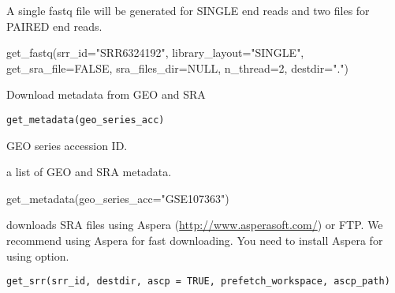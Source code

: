 \documentclass[letterpaper]{book}
\begin{document}
%
\begin{Value}
A single fastq file will be generated for SINGLE end reads and two files for PAIRED end reads.
\end{Value}
%
\begin{Examples}
\begin{ExampleCode}
get_fastq(srr_id="SRR6324192", library_layout="SINGLE", get_sra_file=FALSE, 
sra_files_dir=NULL, n_thread=2, destdir=".")

\end{ExampleCode}
\end{Examples}
%
\begin{Description}\relax
Download metadata from GEO and SRA
\end{Description}
%
\begin{Usage}
\begin{verbatim}
get_metadata(geo_series_acc)
\end{verbatim}
\end{Usage}
%
\begin{Arguments}
\begin{ldescription}
\item[\code{geo\_series\_acc}] GEO series accession ID.
\end{ldescription}
\end{Arguments}
%
\begin{Value}
a list of GEO and SRA metadata.
\end{Value}
%
\begin{Examples}
\begin{ExampleCode}

get_metadata(geo_series_acc="GSE107363")

\end{ExampleCode}
\end{Examples}
%
\begin{Description}\relax
{} downloads SRA files using Aspera (\url{http://www.asperasoft.com/}) or FTP. 
We recommend using Aspera for fast downloading. You need to install Aspera for using  option.
\end{Description}
%
\begin{Usage}
\begin{verbatim}
get_srr(srr_id, destdir, ascp = TRUE, prefetch_workspace, ascp_path)
\end{verbatim}
\end{Usage}
\end{document}
